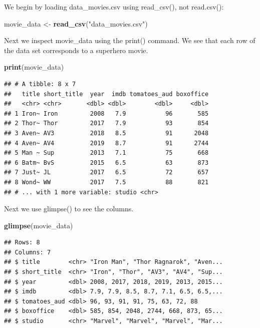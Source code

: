 \documentclass[
]{krantz}
\makeatletter
\newenvironment{Shaded}{\begin{snugshade}}{\end{snugshade}}
\newcommand{\KeywordTok}[1]{\textcolor[rgb]{0.27,0.27,0.27}{\textbf{#1}}}
\newcommand{\NormalTok}[1]{#1}
\newcommand{\StringTok}[1]{\textcolor[rgb]{0.5,0.5,0.5}{#1}}
\newenvironment{kframe}{%
\medskip{}
\setlength{\fboxsep}{.8em}
 \def\at@end@of@kframe{}%
 \ifinner\ifhmode%
  \def\at@end@of@kframe{\end{minipage}}%
  \begin{minipage}{\columnwidth}%
 \fi\fi%
 \def\FrameCommand##1{\hskip\@totalleftmargin \hskip-\fboxsep
 \colorbox{shadecolor}{##1}\hskip-\fboxsep
     \hskip-\linewidth \hskip-\@totalleftmargin \hskip\columnwidth}%
 \MakeFramed {\advance\hsize-\width
   \@totalleftmargin\z@ \linewidth\hsize
   \@setminipage}}%
 {\par\unskip\endMakeFramed%
 \at@end@of@kframe}
\renewenvironment{Shaded}{\begin{kframe}}{\end{kframe}}
\makeatother
\begin{document}
We begin by loading data\_movies.csv using read\_csv(), not read.csv():

\begin{Shaded}
\begin{Highlighting}[]
\NormalTok{movie_data <-}\StringTok{ }\KeywordTok{read_csv}\NormalTok{(}\StringTok{"data_movies.csv"}\NormalTok{)}
\end{Highlighting}
\end{Shaded}

Next we inspect movie\_data using the print() command. We see that each row of the data set corresponds to a superhero movie.

\begin{Shaded}
\begin{Highlighting}[]
\KeywordTok{print}\NormalTok{(movie_data)}
\end{Highlighting}
\end{Shaded}

\begin{verbatim}
## # A tibble: 8 x 7
##   title short_title  year  imdb tomatoes_aud boxoffice
##   <chr> <chr>       <dbl> <dbl>        <dbl>     <dbl>
## 1 Iron~ Iron         2008   7.9           96       585
## 2 Thor~ Thor         2017   7.9           93       854
## 3 Aven~ AV3          2018   8.5           91      2048
## 4 Aven~ AV4          2019   8.7           91      2744
## 5 Man ~ Sup          2013   7.1           75       668
## 6 Batm~ BvS          2015   6.5           63       873
## 7 Just~ JL           2017   6.5           72       657
## 8 Wond~ WW           2017   7.5           88       821
## # ... with 1 more variable: studio <chr>
\end{verbatim}

Next we use glimpse() to see the columns.

\begin{Shaded}
\begin{Highlighting}[]
\KeywordTok{glimpse}\NormalTok{(movie_data)}
\end{Highlighting}
\end{Shaded}

\begin{verbatim}
## Rows: 8
## Columns: 7
## $ title        <chr> "Iron Man", "Thor Ragnarok", "Aven...
## $ short_title  <chr> "Iron", "Thor", "AV3", "AV4", "Sup...
## $ year         <dbl> 2008, 2017, 2018, 2019, 2013, 2015...
## $ imdb         <dbl> 7.9, 7.9, 8.5, 8.7, 7.1, 6.5, 6.5,...
## $ tomatoes_aud <dbl> 96, 93, 91, 91, 75, 63, 72, 88
## $ boxoffice    <dbl> 585, 854, 2048, 2744, 668, 873, 65...
## $ studio       <chr> "Marvel", "Marvel", "Marvel", "Mar...
\end{verbatim}
\end{document}
